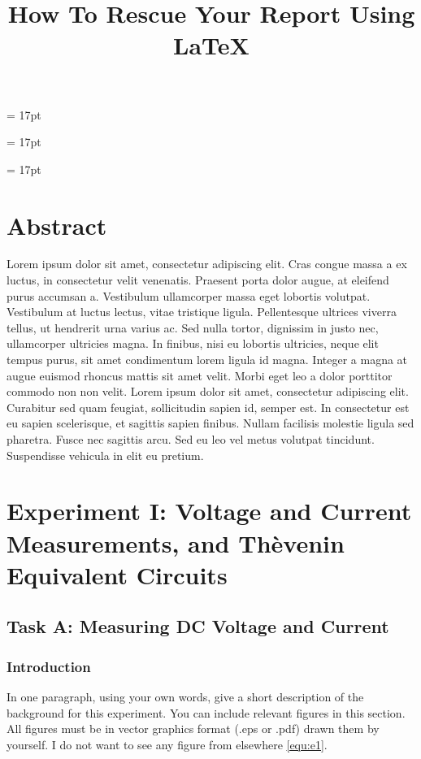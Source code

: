 \documentclass[11pt,times]{eeereport}
\title{How To Rescue Your Report Using \LaTeX{}}
\subtitle{}
\begin{document}
\baselineskip = 17pt
\begin{titlepage}

\newpage
\thispagestyle{empty}
\end{titlepage}

\baselineskip = 17pt

\tableofcontents
\newpage
\baselineskip = 17pt



\section*{Abstract}

Lorem ipsum dolor sit amet, consectetur adipiscing elit. Cras congue massa a ex luctus, in consectetur velit venenatis. Praesent porta dolor augue, at eleifend purus accumsan a. Vestibulum ullamcorper massa eget lobortis volutpat. Vestibulum at luctus lectus, vitae tristique ligula. Pellentesque ultrices viverra tellus, ut hendrerit urna varius ac. Sed nulla tortor, dignissim in justo nec, ullamcorper ultricies magna. In finibus, nisi eu lobortis ultricies, neque elit tempus purus, sit amet condimentum lorem ligula id magna. Integer a magna at augue euismod rhoncus mattis sit amet velit. Morbi eget leo a dolor porttitor commodo non non velit. Lorem ipsum dolor sit amet, consectetur adipiscing elit. Curabitur sed quam feugiat, sollicitudin sapien id, semper est. In consectetur est eu sapien scelerisque, et sagittis sapien finibus. Nullam facilisis molestie ligula sed pharetra. Fusce nec sagittis arcu. Sed eu leo vel metus volutpat tincidunt. Suspendisse vehicula in elit eu pretium.


\section{Experiment I: Voltage and Current Measurements, and Th\`{e}venin Equivalent Circuits}

\subsection{Task A: Measuring DC Voltage and Current}
\subsubsection{Introduction}
In one paragraph, using your own words, give a short description of the background for this experiment.  You can include relevant figures in this section.  All figures must be in vector graphics format (.eps or .pdf) drawn them by yourself.  I do not want to see any figure from elsewhere \ref{equ:e1}. 
\end{document}
